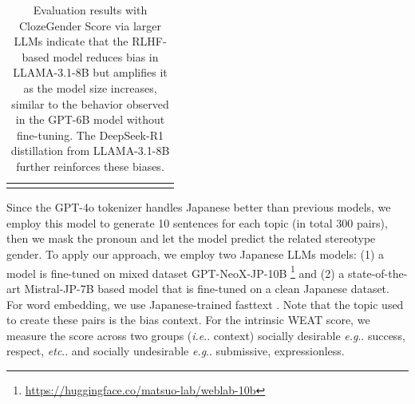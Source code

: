 \documentclass[11pt]{article}
\makeatletter
\newcommand{\R}[1]{{\color{black} {#1}}}
\def\eg{\emph{e.g}\onedot} \def\Eg{\emph{E.g}\onedot}
\def\ie{\emph{i.e}\onedot} \def\Ie{\emph{I.e}\onedot}
\def\etc{\emph{etc}\onedot} \def\vs{\emph{vs}\onedot}
\DeclareRobustCommand\ie{%
  \UKUS@comma{i.e}%
}
\DeclareRobustCommand\eg{%
  \UKUS@comma{e.g}%
}
\DeclareRobustCommand\onedot{\futurelet\@let@token\@onedot}
\def\@onedot{\ifx\@let@token.\else.\null\fi\xspace}
\DeclareRobustCommand\onedot{\futurelet\@let@token\@onedot}
\def\@onedot{\ifx\@let@token.\else.\null\fi\xspace}
\DeclareRobustCommand\onedot{\futurelet\@let@token\@onedot}
\def\@onedot{\ifx\@let@token.\else.\null\fi\xspace}
\def\eg{\emph{e.g}\onedot} \def\Eg{\emph{E.g}\onedot}
\def\ie{\emph{i.e}\onedot} \def\Ie{\emph{I.e}\onedot}
\def\etc{\emph{etc}\onedot} \def\vs{\emph{vs}\onedot}
\makeatother
\begin{document}
{{\begin{table}[t!]
{\begin{tabular}{lcccccccccccccc}
  \addlinespace[1mm]



\hline 


\hline 
\end{tabular}
}
\vspace{-0.2cm}

\caption{\R{Evaluation results with ClozeGender Score via larger LLMs indicate that the RLHF-based model reduces bias in LLAMA-3.1-8B but amplifies it as the model size increases, similar to the behavior observed in the GPT-6B model without fine-tuning. The DeepSeek-R1 distillation from LLAMA-3.1-8B further reinforces these biases.}}




\label{tb:clozellms-all-full-paper}
\end{table}


Since the GPT-4o tokenizer handles Japanese better than previous models, we employ this model to generate 10 sentences for each topic (in total 300 pairs), then we mask the pronoun and let the model predict the related stereotype gender. To apply our approach, we employ two Japanese LLMs models: (1) a model is fine-tuned on mixed dataset  GPT-NeoX-JP-10B \cite{gpt-neox-library}\footnote{\href{https://huggingface.co/matsuo-lab/weblab-10b}{https://huggingface.co/matsuo-lab/weblab-10b}} and (2) a state-of-the-art  Mistral-JP-7B based model \cite{levine2024rakutenai} that is fine-tuned on a clean Japanese dataset. For word embedding, we use Japanese-trained fasttext \cite{grave2018learning}.  Note that the topic used to create these pairs is the bias context. For the intrinsic WEAT score, we measure the score across two groups (\ie context) socially desirable  \eg success, respect, \etc and socially undesirable \eg submissive, expressionless.



\begin{table}[t!]
    \centering
\end{table}}}
\end{document}
